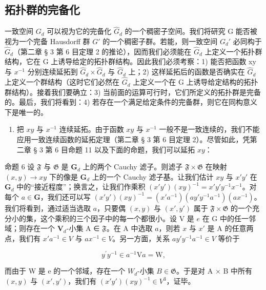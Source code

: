 \subsection{拓扑群的完备化}

一致空间 \(G_{d}\) 可以视为它的完备化 \(\hat{G}_{d}\) 的一个稠密子空间。我们将研究 G 能否被视为一个完备 Hausdorff 群 \(G'\) 的一个稠密子群。若能，则一致空间 \(G_{d}'\) 必同构于 \(\hat{G}_{d}\)（第二章 § 3 第 6 目定理 2 的推论），因而我们必须能在 \(\hat{G}_{d}\) 上定义一个拓扑群结构，它在 G 上诱导给定的拓扑群结构。因此我们必须考察：1) 能否把函数 xy 与 \(x^{-1}\) 分别连续延拓到 \(\hat{G}_{d} \times \hat{G}_{d}\) 与 \(\hat{G}_{d}\) 上；2) 这样延拓后的函数是否确实在 \(\hat{G}_{d}\) 上定义一个群结构（这时它们必然在 \(\hat{G}_{d}\) 上定义一个在 G 上诱导给定结构的拓扑群结构）。接着我们要确立：3) 当前面的运算可行时，它们所定义的拓扑群是完备的。最后，我们将看到：4) 若存在一个满足给定条件的完备群，则它在同构意义下是唯一的。

\begin{enumerate}
\def\labelenumi{\arabic{enumi})}
\tightlist
\item
  把 \(xy\) 与 \(x^{-1}\) 连续延拓。由于函数 \(xy\) 与 \(x^{-1}\) 一般不是一致连续的，我们不能应用一致连续函数的延拓定理（第二章 § 3 第 6 目定理 2）。尽管如此，凭第二章 § 3 第 6 目命题 11 以及下面的命题，我们可以延拓 \(xy\)：
\end{enumerate}

命题 6 设 \(\mathfrak{F}\) 与 \(\mathfrak{G}\) 是 \(\mathbf{G}_d\) 上的两个 Cauchy 滤子。则滤子 \(\mathfrak{F} \times \mathfrak{G}\) 在映射 \((x, y) \to xy\) 下的像是 \(\mathbf{G}_d\) 上的一个 Cauchy 滤子基。让我们估计 \(xy\) 与 \(x'y'\) 在 \(\mathbf{G}_d\) 中的“接近程度”；换言之，让我们作乘积 \((x'y')(xy)^{-1} = x'y'y^{-1}x^{-1}\)。对每个 \(a \in \mathbf{G}\)，我们还可以写 \((x'y')(xy)^{-1} = (x'a^{-1})(ay'y^{-1}a^{-1})(ax^{-1})\)。我们将看到，通过适当选取 \(a\)，只要偶 \((x, y)\) 与 \((x', y')\) 属于 \(\mathfrak{F} \times \mathfrak{G}\) 的一个充分小的集，这个乘积的三个因子中的每一个都很小。设 V 是 \(e\) 在 G 中的任一邻域；则存在一个 \(\mathbf{V}_d\)-小集 A ∈ \(\mathfrak{F}\)。在 A 中选取 \(a\)，则若 \(x\) 与 \(x'\) 是 A 的任意两点，我们有 \(x'a^{-1} \in V\) 与 \(ax^{-1} \in V\)。另一方面，关系 \(ay'y^{-1}a^{-1} \in V\) 等价于

\[
y ^ {\prime} y ^ {- 1} \in a ^ {- 1} \mathrm{V}a = \mathrm{W},
\]

而由于 W 是 e 的一个邻域，存在一个 \(W_{d}\)-小集 \(B \in \mathfrak{G}\)。于是对 A × B 中所有 \((x, y)\) 与 \((x', y')\)，我们有 \((x'y')(xy)^{-1} \in V^{3}\)，证毕。

